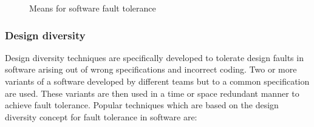 \documentclass[a4paper, 11pt]{article}
\begin{document}
\begin{figure}[htbp]
\hspace*{2cm}
\caption{Means for software fault tolerance}
\end{figure}

\subsubsection{Design diversity}
Design diversity techniques are specifically developed to tolerate design faults in software arising out of wrong specifications and incorrect coding. Two or more variants of a software developed by different teams but to a common specification are used. These variants are then used in a time or space redundant manner to achieve fault tolerance. Popular techniques which are based on the design diversity concept for fault tolerance in software are:
\end{document}
